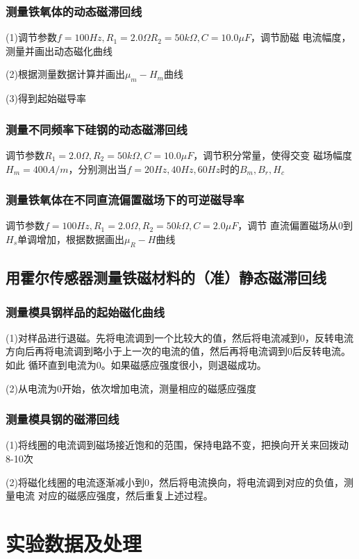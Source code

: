 \documentclass[12pt,a4paper]{article}
\begin{document}
        \subsubsection{测量铁氧体的动态磁滞回线}
            (1)调节参数$f=100Hz,R_1=2.0\Omega R_2=50k\Omega,C=10.0\mu F$，调节励磁
            电流幅度，测量并画出动态磁化曲线\par
            (2)根据测量数据计算并画出$\mu_m - H_m$曲线\par
            (3)得到起始磁导率
        \subsubsection{测量不同频率下硅钢的动态磁滞回线}
            调节参数$R_1=2.0\Omega,R_2=50k\Omega,C=10.0\mu F$，调节积分常量，使得交变
            磁场幅度$H_m=400A/m$，分别测出当$f=20Hz,40Hz,60Hz$时的$B_m,B_r,H_c$
        \subsubsection{测量铁氧体在不同直流偏置磁场下的可逆磁导率}
            调节参数$f = 100Hz,{R_1} = 2.0\Omega ,{R_2} = 50k\Omega ,C = 2.0\mu F$，调节
            直流偏置磁场从$0$到$H_s$单调增加，根据数据画出$\mu_R - H$曲线
    \subsection{用霍尔传感器测量铁磁材料的（准）静态磁滞回线}
        \subsubsection{测量模具钢样品的起始磁化曲线}
            (1)对样品进行退磁。先将电流调到一个比较大的值，然后将电流减到0，反转电流
            方向后再将电流调到略小于上一次的电流的值，然后再将电流调到0后反转电流。如此
            循环直到电流为0。如果磁感应强度很小，则退磁成功。\par
            (2)从电流为0开始，依次增加电流，测量相应的磁感应强度
        \subsubsection{测量模具钢的磁滞回线}
            (1)将线圈的电流调到磁场接近饱和的范围，保持电路不变，把换向开关来回拨动8-10次\par
            (2)将磁化线圈的电流逐渐减小到0，然后将电流换向，将电流调到对应的负值，测量电流
            对应的磁感应强度，然后重复上述过程。

\section{实验数据及处理}
\end{document}
